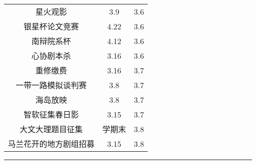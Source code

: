 \documentclass[letterpaper, 12pt]{article}
\begin{document}
\begin{multicols}{2}
{\begin{longtable}{|c|c|c|}
    星火观影 & 3.9 & 3.6\\
    银星杯论文竞赛 & 4.22 & 3.6\\
    南辩院系杯 & 4.12 & 3.6\\
    心协剧本杀 & 3.16 & 3.6\\
    重修缴费 & 3.16 & 3.7\\
    一带一路模拟谈判赛 & 3.8 & 3.7\\
    海岛放映 & 3.8 & 3.7\\
    智软征集春日影 & 3.15 & 3.7\\
    大文大理题目征集 & 学期末 & 3.8\\
    马兰花开的地方剧组招募 & 3.15 & 3.8\\
    \hline
\end{longtable}
\unskip
\unpenalty
\unpenalty}\unvbox\colbbox
\end{multicols}
\hrule
\pagebreak
\end{document}
